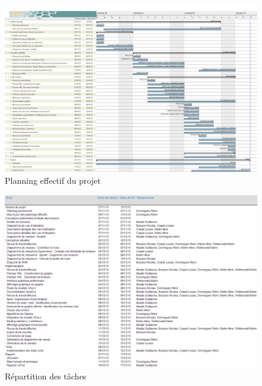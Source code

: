 \begin{landscape}
\begin{figure}[h]
    \centering
    \includegraphics[width=240mm]{../diagrams/project_management/planning_effectif/planning_effectif.png}
    \caption{Planning effectif du projet}
    \label{diagram:planning_effectif}
\end{figure}
\end{landscape}
\pagebreak

\begin{landscape}
\begin{figure}[h]
    \centering
    \includegraphics[width=220mm]{../diagrams/project_management/planning_effectif/tasks_repartition.png}
    \caption{R\'epartition des t\^aches}
    \label{diagram:tasks_repartition}
\end{figure}
\end{landscape}
\pagebreak

